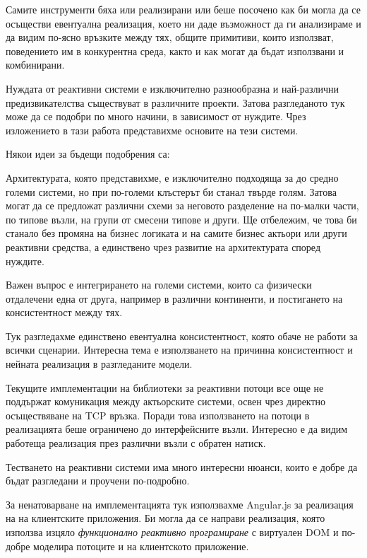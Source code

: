 Самите инструменти бяха или реализирани или беше посочено как би могла да се осъществи евентуална реализация, което ни даде възможност да ги анализираме и да видим по-ясно връзките между тях, общите примитиви, които използват, поведението им в конкурентна среда, както и как могат да бъдат използвани и комбинирани.

Нуждата от реактивни системи е изключително разнообразна и най-различни предизвикателства съществуват в различните проекти. Затова разгледаното тук може да се подобри по много начини, в зависимост от нуждите. Чрез изложението в тази работа представихме основите на тези системи.

Някои идеи за бъдещи подобрения са:

\begin{itemize*}
  \item Архитектурата, която представихме, е изключително подходяща за до средно големи системи, но при по-големи клъстерът би станал твърде голям. Затова могат да се предложат различни схеми за неговото разделение на по-малки части, по типове възли, на групи от смесени типове и други. Ще отбележим, че това би станало без промяна на бизнес логиката и на самите бизнес актьори или други реактивни средства, а единствено чрез развитие на архитектурата според нуждите.
  
  \item Важен въпрос е интегрирането на големи системи, които са физически отдалечени една от друга, например в различни континенти, и постигането на консистентност между тях.
  
  \item Тук разгледахме единствено евентуална консистентност, която обаче не работи за всички сценарии. Интересна тема е използването на причинна консистентност и нейната реализация в разгледаните модели.
  
  \item Текущите имплементации на библиотеки за реактивни потоци все още не поддържат комуникация между актьорските системи, освен чрез директно осъществяване на TCP връзка. Поради това използването на потоци в реализацията беше ограничено до интерфейсните възли. Интересно е да видим работеща реализация през различни възли с обратен натиск.
  
  \item Тестването на реактивни системи има много интересни нюанси, които е добре да бъдат разгледани и проучени по-подробно.
  
  \item За ненатоварване на имплементацията тук използвахме Angular.js за реализация на  на клиентските приложения. Би могла да се направи реализация, която използва изцяло \emph{функционално реактивно програмиране} с виртуален DOM и по-добре моделира потоците и на клиентското приложение.
\end{itemize*}
